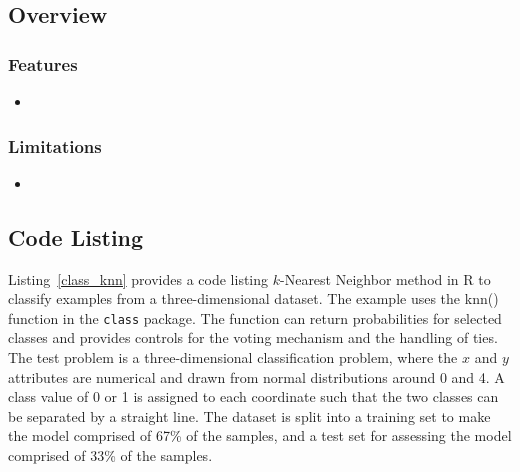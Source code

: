 \subsection{Overview}

\subsubsection{Features}

\begin{itemize}
	\item 
\end{itemize}

\subsubsection{Limitations}

\begin{itemize}
	\item 
\end{itemize}


\subsection{Code Listing}
Listing~\ref{class_knn} provides a code listing $k$-Nearest Neighbor method in R to classify examples from a three-dimensional dataset.
The example uses the {knn()} function in the \texttt{class} package. The function can return probabilities for selected classes and provides controls for the voting mechanism and the handling of ties.
The test problem is a three-dimensional classification problem, where the $x$ and $y$ attributes are numerical and drawn from normal distributions around 0 and 4. A class value of 0 or 1 is assigned to each coordinate such that the two classes can be separated by a straight line. The dataset is split into a training set to make the model comprised of 67\% of the samples, and a test set for assessing the model comprised of 33\% of the samples.




